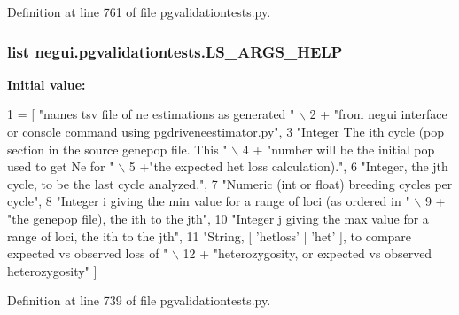 Definition at line 761 of file pgvalidationtests.\+py.

\subsubsection[{\texorpdfstring{L\+S\+\_\+\+A\+R\+G\+S\+\_\+\+H\+E\+LP}{LS_ARGS_HELP}}]{\setlength{\rightskip}{0pt plus 5cm}list negui.\+pgvalidationtests.\+L\+S\+\_\+\+A\+R\+G\+S\+\_\+\+H\+E\+LP}\hypertarget{namespacenegui_1_1pgvalidationtests_a219d6900553eeb3e1f1a11286170cced}{}\label{namespacenegui_1_1pgvalidationtests_a219d6900553eeb3e1f1a11286170cced}
{\bfseries Initial value\+:}
\begin{DoxyCode}
1 = [ \textcolor{stringliteral}{"names tsv file of ne estimations as generated "} \(\backslash\)
2                         + \textcolor{stringliteral}{"from negui interface or console command using pgdriveneestimator.py"},
3                         \textcolor{stringliteral}{"Integer The ith cycle (pop section in the source genepop file.  This "} \(\backslash\)
4                         +   \textcolor{stringliteral}{"number will be the initial pop used to get Ne for "} \(\backslash\)
5                         +\textcolor{stringliteral}{"the expected het loss calculation)."},
6                         \textcolor{stringliteral}{"Integer, the jth cycle, to be the last cycle analyzed."}, 
7                         \textcolor{stringliteral}{"Numeric (int or float) breeding cycles per cycle"},
8                         \textcolor{stringliteral}{"Integer i giving the min value for a range of loci (as ordered in "} \(\backslash\)
9                         + \textcolor{stringliteral}{"the genepop file), the ith to the jth"}, 
10                         \textcolor{stringliteral}{"Integer j giving the max value for a range of loci, the ith to the jth"},
11                         \textcolor{stringliteral}{"String, [ 'hetloss' | 'het'  ], to compare expected vs observed loss of "} \(\backslash\)
12                         + \textcolor{stringliteral}{"heterozygosity, or expected vs observed heterozygosity"} ]
\end{DoxyCode}


Definition at line 739 of file pgvalidationtests.\+py.

